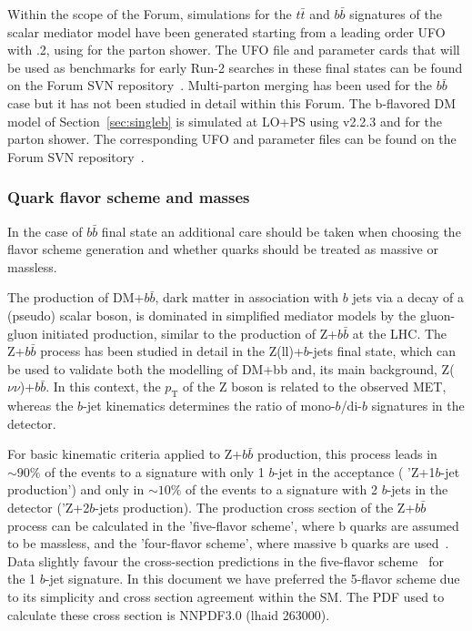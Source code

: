 Within the scope of the Forum, simulations for the $t \bar{t}$ and $b \bar{b}$ signatures of the scalar mediator model have been 
generated starting from a leading order UFO with .2, using \pythiaEight for the parton shower. 
The UFO file and parameter cards that will be used as benchmarks 
for early Run-2 searches in these final states can be found on the Forum SVN repository~\cite{ForumSVN_DMTTBar}.
Multi-parton merging has been used for the $b \bar{b}$ case but it has not been studied in detail within this Forum. 
The b-flavored DM model of Section~\ref{sec:singleb} is simulated at LO+PS using \madgraph v2.2.3 and \pythiaEight for the parton shower.  
The corresponding UFO and parameter files can be found on the Forum SVN repository~\cite{ForumSVN_DMSingleB}.

\subsubsection{Quark flavor scheme and masses}

In the case of $b \bar{b}$ final state an additional care should be taken when choosing the flavor scheme 
generation and whether quarks should be treated as massive or massless.

The production of DM+$b\bar{b}$, dark matter in association with $b$ jets via a decay of a (pseudo) scalar boson, 
is dominated in simplified mediator models by the gluon-gluon initiated production, similar to the production of 
Z+$b\bar{b}$ at the LHC. The Z+$b\bar{b}$ process has been studied in detail in the Z(ll)+$b$-jets final state,  
which can be used to validate both the modelling of DM+bb and, its main background, Z($\nu\nu$)+$b\bar{b}$. 
In this context, the $p_\textrm{T}$ of the Z boson is related to the observed MET, whereas the $b$-jet kinematics 
determines the ratio of mono-$b$/di-$b$ signatures in the detector.

For basic kinematic criteria applied to Z+$b\bar{b}$ production, 
this process leads in $\sim90\%$ of the events to a signature with only 1 $b$-jet in the acceptance (
'Z+1$b$-jet production') and only in  $\sim10\%$ of the events to a signature with 2 $b$-jets in the detector ('Z+2$b$-jets production). 
The production cross section of the Z+$b\bar{b}$ process can be calculated in the 'five-flavor scheme', 
where b quarks are assumed to be massless, and the 'four-flavor scheme', where massive b quarks are 
used~\cite{Campbell:2003dd,Maltoni:2005wd,Campbell:2005zv}.
Data slightly favour the cross-section predictions in the five-flavor scheme~\cite{Chatrchyan:2014dha} for the 1 $b$-jet signature. 
In this document we have preferred the 5-flavor scheme due to its simplicity and  
cross section agreement within the SM. 
The PDF used to calculate these cross section is NNPDF3.0 (lhaid 263000). 

